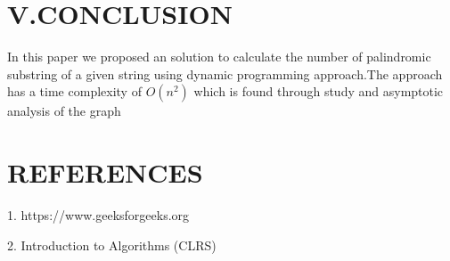 \documentclass[twocolumn]{article}
\begin{document}
\section*{V.CONCLUSION
}
In this paper we proposed an solution to calculate the number of palindromic substring of a given string using dynamic programming approach.The approach has a time complexity of $O(n^2)$ which is found through  study and asymptotic analysis of the graph
\section*{REFERENCES    
}


      1. https://www.geeksforgeeks.org
      
      2. Introduction to Algorithms (CLRS)
\end{document}
